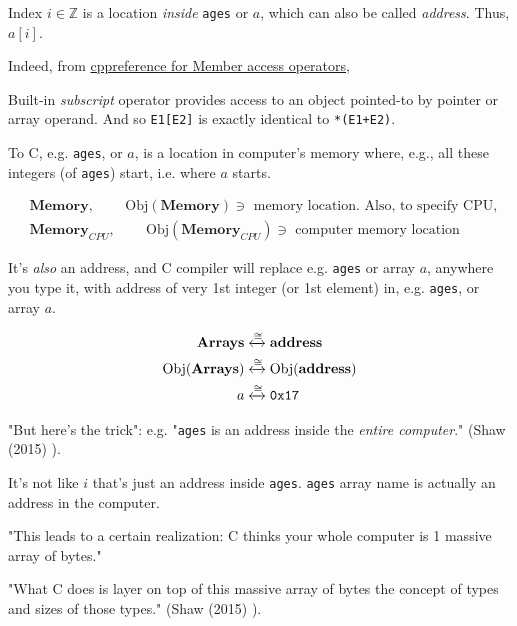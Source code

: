 \documentclass[10pt]{amsart}
\begin{document}
Index $i\in \mathbb{Z}$ is a location \emph{inside} \verb|ages| or $a$, which can also be called \emph{address}.  Thus, $a[i]$.  

Indeed, from \href{http://en.cppreference.com/w/cpp/language/operator_member_access}{cppreference for Member access operators}, 

Built-in \emph{subscript} operator provides access to an object pointed-to by pointer or array operand.  And so \verb|E1[E2]| is exactly identical to \verb|*(E1+E2)|.  


To C, e.g. \verb|ages|, or $a$, is a location in computer's memory where, e.g., all these integers (of \verb|ages|) start, i.e. where $a$ starts.  

\[
\begin{aligned}
& \textbf{Memory} , \qquad \, \text{Obj}{(\textbf{Memory})} \ni \text{ memory location.  Also, to specify CPU, } \\ 
& \textbf{Memory}_{CPU} , \qquad \, \text{Obj}{(\textbf{Memory}_{CPU})} \ni \text{ computer memory location }
\end{aligned}
\]

It's \emph{also} an address, and C compiler will replace e.g. \verb|ages| or array $a$, anywhere you type it, with address of very 1st integer (or 1st element) in, e.g. \verb|ages|, or array $a$.  

\[
\begin{gathered}
\begin{aligned}
\textbf{Arrays} & \xleftrightarrow{ \cong } \textbf{address}  \\
\text{Obj}{(\textbf{Arrays} )} & \xleftrightarrow{ \cong } \text{Obj}{(\textbf{address} )}  \\
a & \xleftrightarrow{ \cong } \verb|0x17|  \\
\end{aligned}
\end{gathered}
\]

"But here's the trick": e.g. "\verb|ages| is an address inside the \emph{entire computer}." (Shaw (2015) \cite{Shaw2015}).  

It's not like $i$ that's just an address inside \verb|ages|.  \verb|ages| array name is actually an address in the computer.     

"This leads to a certain realization: C thinks your whole computer is 1 massive array of bytes."  

"What C does is layer on top of this massive array of bytes the concept of types and sizes of those types." (Shaw (2015) \cite{Shaw2015}).  
\end{document}
